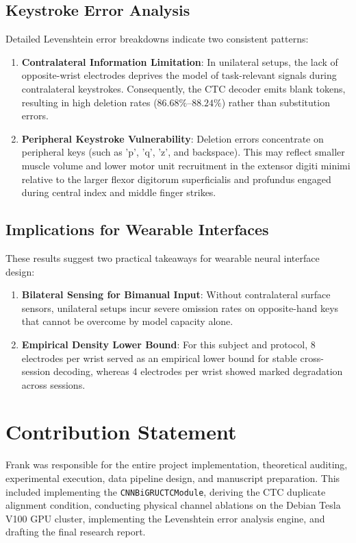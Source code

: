 \documentclass{article}
\begin{document}
\subsection{Keystroke Error Analysis}
Detailed Levenshtein error breakdowns indicate two consistent patterns:
\begin{enumerate}
    \item \textbf{Contralateral Information Limitation}: In unilateral setups, the lack of opposite-wrist electrodes deprives the model of task-relevant signals during contralateral keystrokes. Consequently, the CTC decoder emits blank tokens, resulting in high deletion rates ($86.68\%$--$88.24\%$) rather than substitution errors.
    \item \textbf{Peripheral Keystroke Vulnerability}: Deletion errors concentrate on peripheral keys (such as 'p', 'q', 'z', and backspace). This may reflect smaller muscle volume and lower motor unit recruitment in the extensor digiti minimi relative to the larger flexor digitorum superficialis and profundus engaged during central index and middle finger strikes.
\end{enumerate}

\subsection{Implications for Wearable Interfaces}
These results suggest two practical takeaways for wearable neural interface design:
\begin{enumerate}
    \item \textbf{Bilateral Sensing for Bimanual Input}: Without contralateral surface sensors, unilateral setups incur severe omission rates on opposite-hand keys that cannot be overcome by model capacity alone.
    \item \textbf{Empirical Density Lower Bound}: For this subject and protocol, 8 electrodes per wrist served as an empirical lower bound for stable cross-session decoding, whereas 4 electrodes per wrist showed marked degradation across sessions.
\end{enumerate}

\clearpage
\section*{Contribution Statement}
Frank was responsible for the entire project implementation, theoretical auditing, experimental execution, data pipeline design, and manuscript preparation. This included implementing the \texttt{CNNBiGRUCTCModule}, deriving the CTC duplicate alignment condition, conducting physical channel ablations on the Debian Tesla V100 GPU cluster, implementing the Levenshtein error analysis engine, and drafting the final research report.
\end{document}
